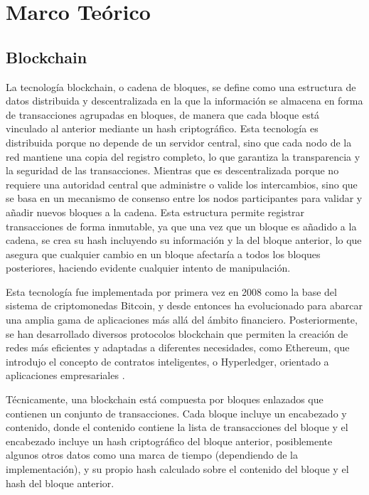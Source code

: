 \chapter[Marco Teórico]{Marco Teórico}
\label{cp:theoretical-framework}

\parindent0pt



\section{Blockchain}

La tecnología blockchain, o cadena de bloques, se define como una estructura de datos distribuida y descentralizada en la que la información se almacena en forma de transacciones agrupadas en bloques, de manera que cada bloque está vinculado al anterior mediante un hash criptográfico. Esta tecnología es distribuida porque no depende de un servidor central, sino que cada nodo de la red mantiene una copia del registro completo, lo que garantiza la transparencia y la seguridad de las transacciones. Mientras que es descentralizada porque no requiere una autoridad central que administre o valide los intercambios, sino que se basa en un mecanismo de consenso entre los nodos participantes para validar y añadir nuevos bloques a la cadena. Esta estructura permite registrar transacciones de forma inmutable, ya que una vez que un bloque es añadido a la cadena, se crea su hash incluyendo su información y la del bloque anterior, lo que asegura que cualquier cambio en un bloque afectaría a todos los bloques posteriores, haciendo evidente cualquier intento de manipulación.

Esta tecnología fue implementada por primera vez en 2008 como la base del sistema de criptomonedas Bitcoin, y desde entonces ha evolucionado para abarcar una amplia gama de aplicaciones más allá del ámbito financiero. Posteriormente, se han desarrollado diversos protocolos blockchain que permiten la creación de redes más eficientes y adaptadas a diferentes necesidades, como Ethereum, que introdujo el concepto de contratos inteligentes, o Hyperledger, orientado a aplicaciones empresariales \cite{farhana2022blockchain, rennock2018blockchain}.

Técnicamente, una blockchain está compuesta por bloques enlazados que contienen un conjunto de transacciones. Cada bloque incluye un encabezado y contenido, donde el contenido contiene la lista de transacciones del bloque y el encabezado incluye un hash criptográfico del bloque anterior, posiblemente algunos otros datos como una marca de tiempo (dependiendo de la implementación), y su propio hash calculado sobre el contenido del bloque y el hash del bloque anterior.

